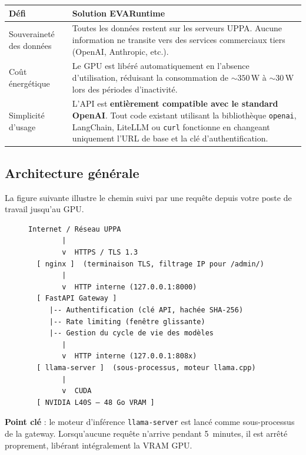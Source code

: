 \documentclass[12pt, a4paper, twoside]{article}
\begin{document}
\begin{center}
\begin{tabular}{L{3.5cm} L{9cm}}
  \toprule
  \textbf{Défi} & \textbf{Solution EVARuntime} \\
  \midrule
  Souveraineté des données
    & Toutes les données restent sur les serveurs UPPA. Aucune information ne transite
      vers des services commerciaux tiers (OpenAI, Anthropic, etc.). \\
  \addlinespace
  Coût énergétique
    & Le GPU est libéré automatiquement en l'absence d'utilisation, réduisant la consommation
      de $\sim350$\,W à $\sim30$\,W lors des périodes d'inactivité. \\
  \addlinespace
  Simplicité d'usage
    & L'API est \textbf{entièrement compatible avec le standard OpenAI}. Tout code existant
      utilisant la bibliothèque \texttt{openai}, LangChain, LiteLLM ou \texttt{curl} fonctionne
      en changeant uniquement l'URL de base et la clé d'authentification. \\
  \bottomrule
\end{tabular}
\end{center}

\subsection{Architecture générale}

La figure suivante illustre le chemin suivi par une requête depuis votre poste de travail
jusqu'au GPU.

\begin{figure}[h]
\centering
\begin{minipage}{0.85\textwidth}
\begin{lstlisting}[style=bashstyle, frame=single, caption={Vue schématique de l'architecture}]
Internet / Réseau UPPA
        |
        v  HTTPS / TLS 1.3
  [ nginx ]  (terminaison TLS, filtrage IP pour /admin/)
        |
        v  HTTP interne (127.0.0.1:8000)
  [ FastAPI Gateway ]
     |-- Authentification (clé API, hachée SHA-256)
     |-- Rate limiting (fenêtre glissante)
     |-- Gestion du cycle de vie des modèles
        |
        v  HTTP interne (127.0.0.1:808x)
  [ llama-server ]  (sous-processus, moteur llama.cpp)
        |
        v  CUDA
  [ NVIDIA L40S — 48 Go VRAM ]
\end{lstlisting}
\end{minipage}
\end{figure}

\textbf{Point clé} : le moteur d'inférence \texttt{llama-server} est lancé comme sous-processus
de la gateway. Lorsqu'aucune requête n'arrive pendant 5~minutes, il est arrêté proprement,
libérant intégralement la VRAM GPU.
\end{document}
